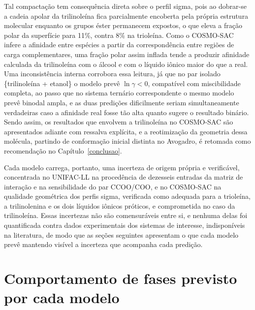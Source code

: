 Tal compactação tem consequência direta sobre o perfil sigma, pois ao dobrar-se a cadeia apolar da trilinoleína fica parcialmente encoberta pela própria estrutura molecular enquanto os grupos éster permanecem expostos, o que eleva a fração polar da superfície para 11\%, contra 8\% na trioleína. Como o COSMO-SAC infere a afinidade entre espécies a partir da correspondência entre regiões de carga complementares, uma fração polar assim inflada tende a produzir afinidade calculada da trilinoleína com o álcool e com o líquido iônico maior do que a real. Uma inconsistência interna corrobora essa leitura, já que no par isolado \{trilinoleína + etanol\} o modelo prevê $\ln \gamma < 0$, compatível com miscibilidade completa, ao passo que no sistema ternário correspondente o mesmo modelo prevê binodal ampla, e as duas predições dificilmente seriam simultaneamente verdadeiras caso a afinidade real fosse tão alta quanto sugere o resultado binário. Sendo assim, os resultados que envolvem a trilinoleína no COSMO-SAC são apresentados adiante com ressalva explícita, e a reotimização da geometria dessa molécula, partindo de conformação inicial distinta no Avogadro, é retomada como recomendação no Capítulo~\ref{conclusao}.

Cada modelo carrega, portanto, uma incerteza de origem própria e verificável, concentrada no UNIFAC-LL na procedência de dezesseis entradas da matriz de interação e na sensibilidade do par CCOO/COO, e no COSMO-SAC na qualidade geométrica dos perfis sigma, verificada como adequada para a trioleína, a trilinolenina e os dois líquidos iônicos próticos, e comprometida no caso da trilinoleína. Essas incertezas não são comensuráveis entre si, e nenhuma delas foi quantificada contra dados experimentais dos sistemas de interesse, indisponíveis na literatura, de modo que as seções seguintes apresentam o que cada modelo prevê mantendo visível a incerteza que acompanha cada predição.

\section{Comportamento de fases previsto por cada modelo}
\label{sec:resultados_por_sistema}

